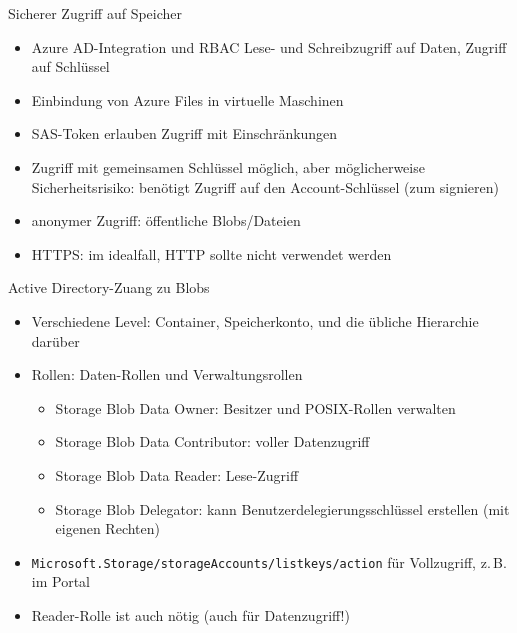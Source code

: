 \begin{flashcard}[Definition]{Sicherer Zugriff auf Speicher}
  \begin{itemize}
    \item Azure AD-Integration und RBAC\newline
      Lese- und Schreibzugriff auf Daten, Zugriff auf Schlüssel
    \item Einbindung von Azure Files in virtuelle Maschinen
    \item SAS-Token erlauben Zugriff mit Einschränkungen
    \item Zugriff mit gemeinsamen Schlüssel möglich, aber möglicherweise Sicherheitsrisiko:\newline
      benötigt Zugriff auf den Account-Schlüssel (zum signieren)
    \item anonymer Zugriff: öffentliche Blobs/Dateien
    \item HTTPS: im idealfall, HTTP sollte nicht verwendet werden
  \end{itemize}
\end{flashcard}


\begin{flashcard}[Definition]{Active Directory-Zuang zu Blobs}
  \begin{itemize}
    \item Verschiedene Level: Container, Speicherkonto,\newline
      und die übliche Hierarchie darüber
    \item Rollen: Daten-Rollen und Verwaltungsrollen
      \begin{itemize}
        \item Storage Blob Data Owner: Besitzer und POSIX-Rollen verwalten
        \item Storage Blob Data Contributor: voller Datenzugriff
        \item Storage Blob Data Reader: Lese-Zugriff
        \item Storage Blob Delegator: kann Benutzerdelegierungsschlüssel erstellen\newline
        (mit eigenen Rechten)
      \end{itemize}
    \item \texttt{Microsoft.Storage/storageAccounts/listkeys/action} für Vollzugriff, z.\,B. im Portal
    \item Reader-Rolle ist auch nötig (auch für Datenzugriff!)
  \end{itemize}
\end{flashcard}

